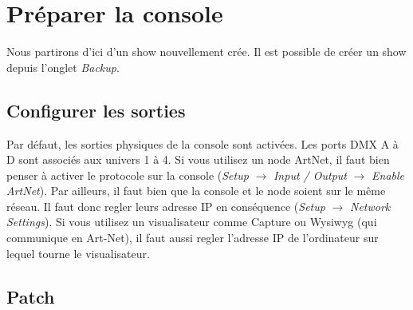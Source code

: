 \section{Préparer la console}
\label{sec:preparer_la_console}

Nous partirons d'ici d'un show nouvellement crée. Il est possible de créer un show
depuis l'onglet \textit{Backup}.

\subsection{Configurer les sorties}
\label{subsec:prep_sorties}

Par défaut, les sorties physiques de la console sont activées. Les ports DMX A à D sont associés aux univers 1 à 4.
Si vous utilisez un node ArtNet, il faut bien penser à activer le protocole sur la console (\textit{Setup} $\rightarrow$ \textit{Input / Output} $\rightarrow$ \textit{Enable ArtNet}).
Par ailleurs, il faut bien que la console et le node soient sur le même réseau. Il faut donc regler leurs adresse IP en conséquence (\textit{Setup} $\rightarrow$ \textit{Network Settings}).
\newline
Si vous utilisez un visualisateur comme Capture ou Wysiwyg (qui communique en Art-Net), il faut aussi regler l'adresse IP de l'ordinateur sur lequel tourne le visualisateur.

\subsection{Patch}
\label{subsec:prep_patch}

